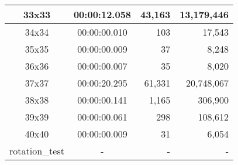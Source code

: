 \begin{center}
\begin{tabular}{|c|c|r|r|}
		33x33 & 00:00:12.058 & 43,163 & 13,179,446 \\ \hline
		34x34 & 00:00:00.010 & 103 & 17,543 \\ \hline
		35x35 & 00:00:00.009 & 37 & 8,248 \\ \hline
		36x36 & 00:00:00.007 & 35 & 8,020 \\ \hline
		37x37 & 00:00:20.295 & 61,331 & 20,748,067 \\ \hline
		38x38 & 00:00:00.141 & 1,165 & 306,900 \\ \hline
		39x39 & 00:00:00.061 & 298 & 108,612 \\ \hline
		40x40 & 00:00:00.009 & 31 & 6,054 \\ \hline
		rotation\_test & - & - & - \\ \hline

    \end{tabular}
\end{center}
